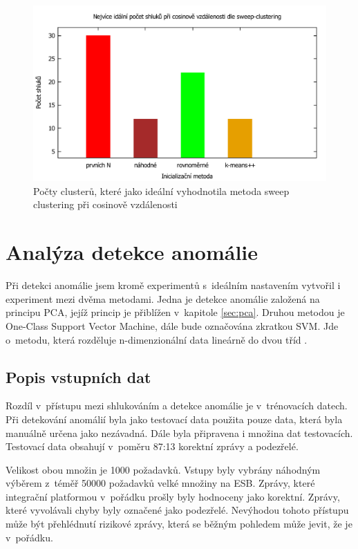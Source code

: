 \documentclass[thesis=M,czech]{FITthesis}[2012/10/20]
\newcommand{\tmpframe}[1]{\fbox{#1}}
\renewcommand{\tmpframe}[1]{#1}
\begin{document}
		\begin{figure}[htb]\centering
			\tmpframe{\includegraphics[width=\textwidth]{./img/cosine-sweep-clusters}}	
			\caption{Počty clusterů, které jako ideální vyhodnotila metoda sweep clustering při cosinově vzdálenosti}
			\label{fig:k-means-num-clusters-cosine}
		\end{figure}
	
		
	\section{Analýza detekce anomálie}
		Při detekci anomálie jsem kromě experimentů s~ideálním nastavením vytvořil i experiment mezi dvěma metodami. Jedna je detekce anomálie založená na principu PCA, jejíž princip je přiblížen v~kapitole \ref{sec:pca}. Druhou metodou je One-Class Support Vector Machine, dále bude označována zkratkou SVM. Jde o~metodu, která rozděluje n-dimenzionální data lineárně do dvou tříd \cite{svm}.
	
		\subsection{Popis vstupních dat}
			Rozdíl v~přístupu mezi shlukováním a detekce anomálie je v~trénovacích datech. Při detekování anomálií byla jako testovací data použita pouze data, která byla manuálně určena jako nezávadná. Dále byla připravena i množina dat testovacích. Testovací data obsahují v~poměru 87:13 korektní zprávy a podezřelé.
		
			Velikost obou množin je 1000 požadavků. Vstupy byly vybrány náhodným výběrem z~téměř 50000 požadavků velké množiny na ESB. Zprávy, které integrační platformou v~pořádku prošly byly hodnoceny jako korektní. Zprávy, které vyvolávali chyby byly označené jako podezřelé. Nevýhodou tohoto přístupu může být přehlédnutí rizikové zprávy, která se běžným pohledem může jevit, že je v~pořádku.
		
\end{document}
